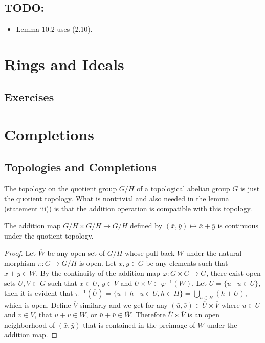 \documentclass{note}
\begin{document}
\section*{TODO:}

\begin{itemize}
  \item Lemma 10.2 uses (2.10).
\end{itemize}

\chapter{Rings and Ideals}

\section*{Exercises}
\setcounter{chapter}{9}

\chapter{Completions}

\section*{Topologies and Completions}

The topology on the quotient group $G/H$ of a topological abelian group $G$ is
just the quotient topology. What is nontrivial and also needed in the lemma
(statement iii)) is that the addition operation is compatible with this
topology.

\begin{lemma*}
  The addition map $G/H \times G/H \to G/H$ defined by $(\bar{x},\bar{y}) \mapsto
    \bar{x}+\bar{y}$ is continuous under the quotient topology.
\end{lemma*}

\begin{proof}
  Let $\overline{W}$ be any open set of $G/H$ whose pull back $W$ under the
  natural morphism $\pi\colon G \to G/H$ is open. Let $x,y \in G$ be any elements
  such that $x + y \in W$. By the continuity of the addition map $\varphi\colon G
    \times G \to G$, there exist open sets $U,V \subset G$ such that $x\in U$,
  $y\in V$ and $U\times V \subset \varphi^{-1}(W)$. Let $\overline{U} = \{\bar{u}
    \mid u \in U\}$, then it is evident that $\pi^{-1}\left(\overline{U}\right) =
    \{u+h \mid u \in U, h \in H\} = \bigcup_{h\in H}(h+U)$, which is open. Define
  $\overline{V}$ similarly and we get for any $(\bar{u},\bar{v}) \in
    \overline{U}\times\overline{V}$ where $u \in U$ and $v \in V$, that $u + v \in
    W$, or $\bar{u} + \bar{v} \in \overline{W}$. Therefore $\overline{U} \times
    \overline{V}$ is an open neighborhood of $(\bar{x},\bar{y})$ that is contained
  in the preimage of $\overline{W}$ under the addition map.
\end{proof}
\end{document}
